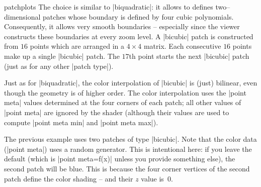 {\begin{pgfplotslibrary}{patchplots}
	The choice  is similar to |biquadratic|: it allows to defines two--dimensional patches whose boundary is defined by four cubic polynomials. Consequently, it allows very smooth boundaries -- especially since the viewer constructs these boundaries at every zoom level. A |bicubic| patch is constructed from $16$ points which are arranged in a $4\times4$ matrix. Each consecutive $16$ points make up a single |bicubic| patch. The $17$th point starts the next |bicubic| patch (just as for any other |patch type|).
\begin{codeexample}[]
\end{codeexample}
	Just as for |biquadratic|, the color interpolation of |bicubic| is (just) bilinear, even though the geometry is of higher order. The color interpolation uses the |point meta| values determined at the four corners of each patch; all other values of |point meta| are ignored by the shader (although their values are used to compute |point meta min| and |point meta max|).
\begin{codeexample}[]
\end{codeexample}
	The previous example uses two patches of type |bicubic|. Note that the color data (|point meta|) uses a random generator. This is intentional here: if you leave the default (which is |point meta=f(x)| unless you provide something else), the second patch will be blue. This is because the four corner vertices of the second patch define the color shading -- and their $z$ value is~$0$.


\end{pgfplotslibrary}}
